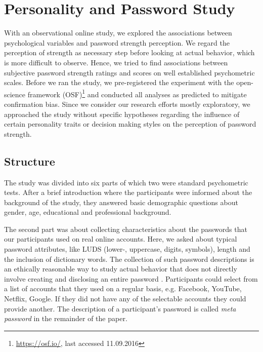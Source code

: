 \section{Personality and Password Study}
With an observational online study, we explored the associations between psychological variables and password strength perception. We regard the perception of strength as necessary step before looking at actual behavior, which is more difficult to observe. Hence, we tried to find associations between subjective password strength ratings and scores on well established psychometric scales. Before we ran the study, we pre-registered the experiment with the open-science framework (OSF)\footnote{\url{https://osf.io/}, last accessed 11.09.2016} and conducted all analyses as predicted to mitigate confirmation bias. Since we consider our research efforts mostly exploratory, we approached the study without specific hypotheses regarding the influence of certain personality traits or decision making styles on the perception of password strength.

\subsection{Structure}
The study was divided into six parts of which two were standard psychometric tests. After a brief introduction where the participants were informed about the background of the study, they answered basic demographic questions about gender, age, educational and professional background. %

The second part was about collecting characteristics about the passwords that our participants used on real online accounts. Here, we asked about typical password attributes, like LUDS (lower-, uppercase, digits, symbols), length and the inclusion of dictionary words. The collection of such password descriptions is an ethically reasonable way to study actual behavior that does not directly involve creating and disclosing an entire password \cite{VonZezschwitz2013SurvivalShortest}. Participants could select from a list of accounts that they used on a regular basis, e.g. Facebook, YouTube, Netflix, Google. If they did not have any of the selectable accounts they could provide another. The description of a participant's password is called \textit{meta password} in the remainder of the paper. 



